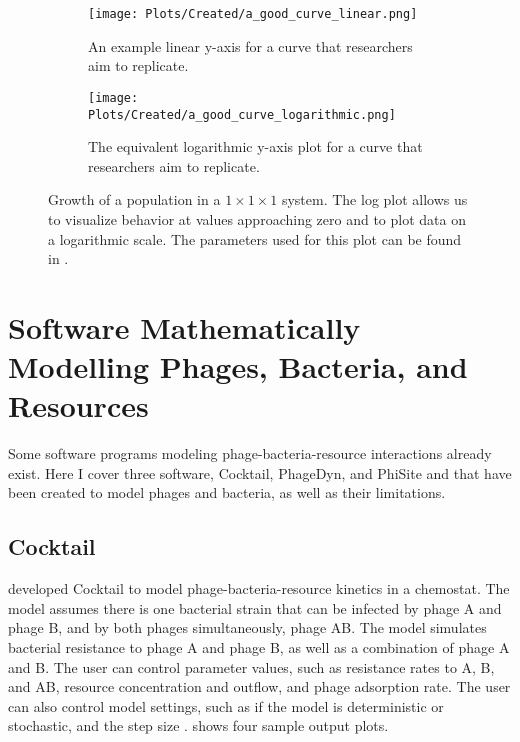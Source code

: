 \begin{figure}[h!]
    \centering
    \begin{subfigure}{1\linewidth}
        \centering
        \captionsetup{width=1\linewidth}
        \texttt{[image: Plots/Created/a\_good\_curve\_linear.png]}
        \caption{
            An example linear y-axis for a curve that researchers aim to replicate. 
        }
        \label{fig:created:a_good_curve_linear}
    \end{subfigure}
    \hfill
    \begin{subfigure}{1\linewidth}
        \centering
        \captionsetup{width=1\linewidth}
        \texttt{[image: Plots/Created/a\_good\_curve\_logarithmic.png]}
        \caption{
            The equivalent logarithmic y-axis plot for a curve that researchers aim to replicate. 
        }
        \label{fig:created:a_good_curve_logarithmic}
    \end{subfigure}
    \caption{
        Growth of a population in a $1\times1\times1$ system. 
        The log plot allows us to visualize behavior at values approaching zero and to plot data on a logarithmic scale. 
        The parameters used for this plot can be found in . 
    }
    \label{fig:created:a_good_curve}
\end{figure}

\section{Software Mathematically Modelling Phages, Bacteria, and Resources}
Some software programs modeling phage-bacteria-resource interactions already exist. 
Here I cover three software, Cocktail, PhageDyn, and PhiSite and that have been created to model phages and bacteria, as well as their limitations. 

\subsection{Cocktail}
\citet{nilssonCocktailComputerProgram2022} developed Cocktail to model phage-bacteria-resource kinetics in a chemostat. 
The model assumes there is one bacterial strain that can be infected by phage A and phage B, and by both phages simultaneously, phage AB. 
The model simulates bacterial resistance to phage A and phage B, as well as a combination of phage A and B. 
The user can control parameter values, such as resistance rates to A, B, and AB, resource concentration and outflow, and phage adsorption rate. 
The user can also control model settings, such as if the model is deterministic or stochastic, and the step size \cite{nilssonCocktailComputerProgram2022}. 
 shows four sample output plots. 

